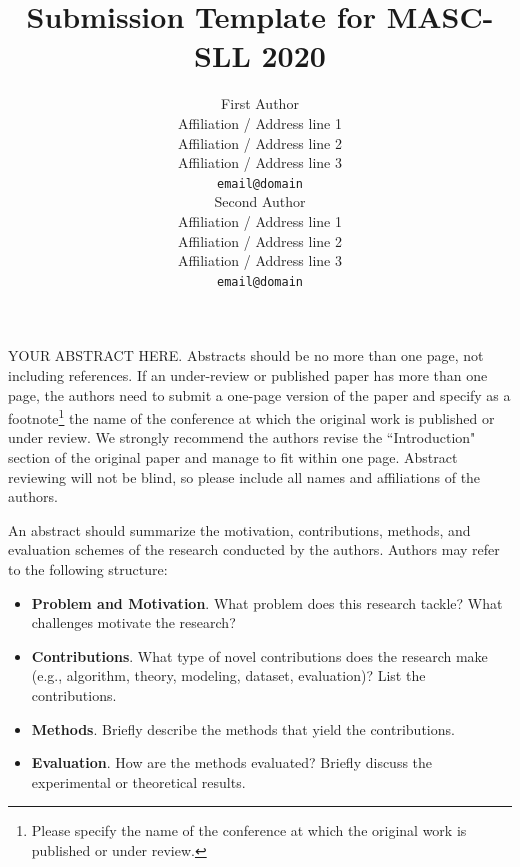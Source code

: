 \documentclass[11pt,a4paper]{article}
\title{Submission Template for MASC-SLL 2020}
\author{First Author \\
  Affiliation / Address line 1 \\
  Affiliation / Address line 2 \\
  Affiliation / Address line 3 \\
  \texttt{email@domain} \\\And
  Second Author \\
  Affiliation / Address line 1 \\
  Affiliation / Address line 2 \\
  Affiliation / Address line 3 \\
  \texttt{email@domain} \\}
\date{}
\begin{document}
\maketitle

YOUR ABSTRACT HERE. Abstracts should be no more than one page, not including references. If an under-review or published paper has more than one page, the authors need to submit a one-page version of the paper and specify as a footnote\footnote{Please specify the name of the conference at which the original work is published or under review.} the name of the conference at which the original work is published or under review. 
We strongly recommend the authors revise the ``Introduction" section of the original paper and manage to fit within one page. 
Abstract reviewing will not be blind, so please include all names and affiliations of the authors.

An abstract should summarize the motivation, contributions, methods, and evaluation schemes of the research conducted by the authors. 
Authors may refer to the following structure:
\begin{itemize}
\item \textbf{Problem and Motivation}. What problem does this research tackle? What challenges motivate the research?
\item \textbf{Contributions}. What type of novel contributions does the research make (e.g., algorithm, theory, modeling, dataset, evaluation)? List the contributions.
\item \textbf{Methods}. Briefly describe the methods that yield the contributions. 
\item\textbf{Evaluation}. How are the methods evaluated? Briefly discuss the experimental or theoretical results. 

\end{itemize}
\end{document}

